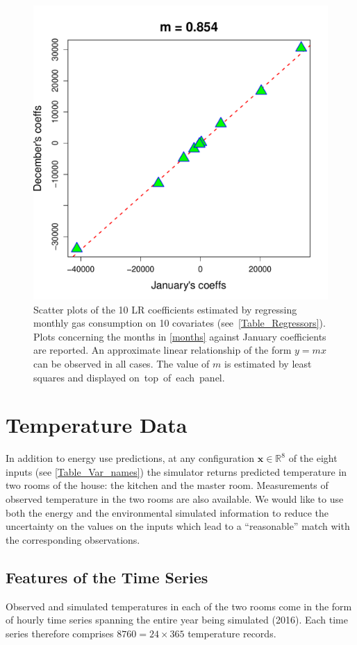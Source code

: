 \documentclass[a4paper, 12pt]{article}
\newcommand{\R}{\mathbb{R}}
\newcommand{\bd}[1]{\boldsymbol{#1}}
\newcommand{\x}{\bd x}
\begin{document}
\begin{figure}
 \includegraphics[scale=\scale]{Compare_LRs/LR_Jan_Dec}
 \caption{Scatter plots of the 10 LR coefficients estimated by regressing monthly gas consumption on 10 covariates (see~\autoref{Table_Regressors}). Plots concerning the months in \eqref{months} against January coefficients are reported. An approximate linear relationship of the form $y=mx$ can be observed in all cases. The value of $m$ is estimated by least squares and displayed \mbox{on top of each panel.}}
 \label{Fig_LR_Jan}
\end{figure}


\newpage

\section{Temperature Data}
In addition to energy use predictions, at any configuration $\x \in \R^8$ of the eight inputs (see \autoref{Table_Var_names}) the simulator returns predicted temperature in two rooms of the house: the kitchen and the master room. 
Measurements of observed temperature in the two rooms are also available. 
We would like to use both the energy and the environmental simulated information to reduce the uncertainty on the values on the inputs which lead to a ``reasonable'' match with the corresponding observations.

\subsection{Features of the Time Series}
Observed and simulated temperatures in each of the two rooms come in the form of hourly time series spanning the entire year being simulated (2016). Each time series therefore comprises $8760 = 24 \times 365$ temperature records. 
\end{document}
